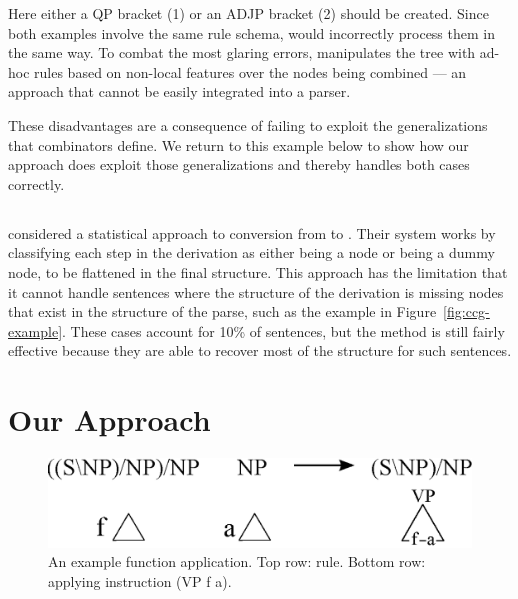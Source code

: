 Here either a QP bracket (1) or an ADJP bracket (2) should be created.  Since
both examples involve the same rule schema, \old would incorrectly process them
in the same way.  To combat the most glaring errors, \old manipulates the \ptb
tree with ad-hoc rules based on non-local features over the \ccg nodes
being combined --- an approach that cannot be easily integrated into a
parser.

These disadvantages are a consequence of failing to exploit the generalizations that \ccg combinators define. 
We return to this example below to show how our approach does exploit those generalizations and thereby handles both cases correctly.

\subsection{\textcite{zhang-zhao-hui:2012:DEMOS}} \label{sec-learned-conv}

\textcite{zhang-zhao-hui:2012:DEMOS} considered a statistical approach to conversion from \ccg to \ptb.
Their system works by classifying each step in the \ccg derivation as either being a \ptb node or being a dummy node, to be flattened in the final structure.
This approach has the limitation that it cannot handle sentences where the structure of the \ccg derivation is missing nodes that exist in the structure of the \ptb parse, such as the example in Figure~\ref{fig:ccg-example}.
These cases account for 10\% of sentences, but the method is still fairly effective because they are able to recover most of the structure for such sentences.

\section{Our Approach}

\begin{figure}
\centering
\includegraphics[width=0.85\linewidth]{figures/ccg-example}
\caption[An example function application during \ccg to \ptb conversion.]{ \label{fig:inst-example}
  An example function application.
  Top row: \ccg rule.
  Bottom row: applying instruction (VP f a).
}
\end{figure}

